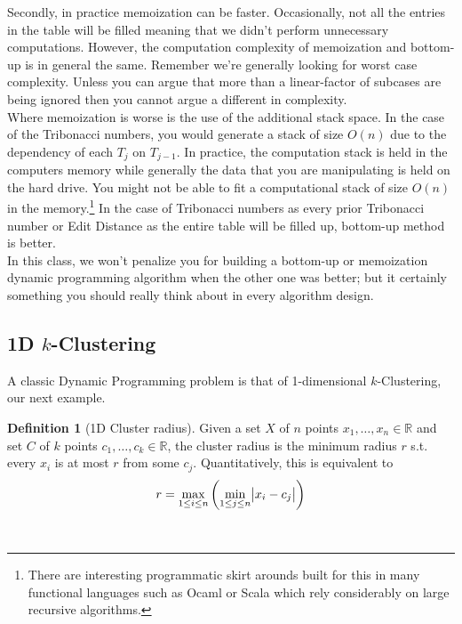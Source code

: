 \documentclass[10pt]{article}
\theoremstyle{plain}
\theoremstyle{definition}
\newtheorem{defn}[thm]{Definition} %
\newcommand{\RR}{\mathbb{R}}
\numberwithin{equation}{section}
\numberwithin{figure}{section}
\begin{document}
\noindent Secondly, in practice memoization can be faster. Occasionally, not all the entries in the table will be filled meaning that we didn't perform unnecessary computations. However, the computation complexity of memoization and bottom-up is in general the same. Remember we're generally looking for worst case complexity. Unless you can argue that more than a linear-factor of subcases are being ignored then you cannot argue a different in complexity. \\

\noindent Where memoization is worse is the use of the additional stack space. In the case of the Tribonacci numbers, you would generate a stack of size $O(n)$ due to the dependency of each $T_j$ on $T_{j-1}$. In practice, the computation stack is held in the computers memory while generally the data that you are manipulating is held on the hard drive. You might not be able to fit a computational stack of size $O(n)$ in the memory.\footnote{There are interesting programmatic skirt arounds built for this in many functional languages such as Ocaml or Scala which rely considerably on large recursive algorithms.} In the case of Tribonacci numbers as every prior Tribonacci number or Edit Distance as the entire table will be filled up, bottom-up method is better. \\

\noindent In this class, we won't penalize you for building a bottom-up or memoization dynamic programming algorithm when the other one was better; but it certainly something you should really think about in every algorithm design.

\subsection{1D $k$-Clustering}
A classic Dynamic Programming problem is that of 1-dimensional $k$-Clustering, our next example.

\begin{defn}[1D Cluster radius]
Given a set $X$ of $n$ points $x_1, \ldots, x_n \in \RR$ and set $C$ of $k$ points $c_1, \ldots, c_k \in \RR$, the cluster radius is the minimum radius $r$ s.t. every $x_i$ is at most $r$ from some $c_j$. Quantitatively, this is equivalent to
\begin{equation}
r = \max_{1 \leq i \leq n} \left( \min_{1 \leq j \leq n} \abs{x_i - c_j} \right)
\end{equation}
\end{defn} \ \\
\end{document}
